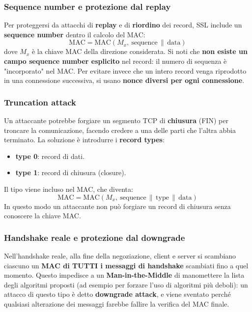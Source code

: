 \subsubsection{Sequence number e protezione dal replay}
Per proteggersi da attacchi di \textbf{replay} e di \textbf{riordino} dei record, SSL include un \textbf{sequence number} dentro il calcolo del MAC:
$$\text{MAC} = \text{MAC}(M_x,\ \text{sequence} \,\|\, \text{data})$$
dove $M_x$ è la chiave MAC della direzione considerata. Si noti che \textbf{non esiste un campo sequence number esplicito} nel record: il numero di sequenza è "incorporato" nel MAC. Per evitare invece che un intero record venga riprodotto in una connessione successiva, si usano \textbf{nonce diversi per ogni connessione}.

\subsubsection{Truncation attack}
Un attaccante potrebbe forgiare un segmento TCP di \textbf{chiusura} (FIN) per troncare la comunicazione, facendo credere a una delle parti che l'altra abbia terminato. La soluzione è introdurre i \textbf{record types}:
\begin{itemize}
    \item \textbf{type 0}: record di dati.
    \item \textbf{type 1}: record di chiusura (closure).
\end{itemize}
Il tipo viene incluso nel MAC, che diventa:
$$\text{MAC} = \text{MAC}(M_x,\ \text{sequence} \,\|\, \text{type} \,\|\, \text{data})$$
In questo modo un attaccante non può forgiare un record di chiusura senza conoscere la chiave MAC.

\subsubsection{Handshake reale e protezione dal downgrade}
Nell'handshake reale, alla fine della negoziazione, client e server si scambiano ciascuno un \textbf{MAC di TUTTI i messaggi di handshake} scambiati fino a quel momento. Questo impedisce a un \textbf{Man-in-the-Middle} di manomettere la lista degli algoritmi proposti (ad esempio per forzare l'uso di algoritmi più deboli): un attacco di questo tipo è detto \textbf{downgrade attack}, e viene sventato perché qualsiasi alterazione dei messaggi farebbe fallire la verifica del MAC finale.

